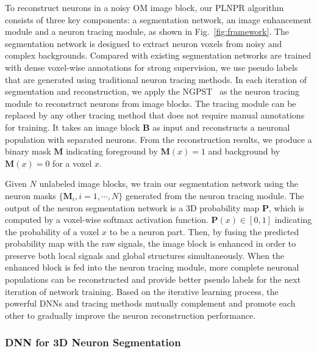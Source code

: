 To reconstruct neurons in a noisy OM image block, our PLNPR algorithm consists of three key components: a segmentation network, an image enhancement module and a neuron tracing module, as shown in Fig.~\ref{fig:framework}. 
%
The segmentation network is designed to extract neuron voxels from noisy and complex backgrounds.
Compared with existing segmentation networks are trained with dense voxel-wise annotations for strong supervision, we use pseudo labels that are generated using traditional neuron tracing methods.
%
In each iteration of segmentation and reconstruction, we apply the NGPST~\cite{Quan2015} as the neuron tracing module to reconstruct neurons from image blocks. 
The tracing module can be replaced by any other tracing method that does not require manual annotations for training.
%
It takes an image block $\mathbf{B}$ as input and reconstructs a neuronal population with separated neurons.
From the reconstruction results, we produce a binary mask $\mathbf{M}$ indicating foreground by $\mathbf{M}(x)=1$ and background by $\mathbf{M}(x)=0$ for a voxel $x$.


Given $N$ unlabeled image blocks, we train our segmentation network using the neuron masks $\{\mathbf{M}_i, i=1,\cdots,N\}$ generated from the neuron tracing module.
%
The output of the neuron segmentation network is a 3D probability map $\mathbf{P}$, which is computed by a voxel-wise softmax activation function. $\mathbf{P}(x)\in [0,1]$ indicating the probability of a voxel $x$ to be a neuron part.
%
Then, by fusing the predicted probability map with the raw signals, the image block is enhanced in order to preserve both local signals and global structures simultaneously.
When the enhanced block is fed into the neuron tracing module, more complete neuronal populations can be reconstructed and provide better pseudo labels for the next iteration of network training. 
%
Based on the iterative learning process, the powerful DNNs and tracing methods mutually complement and promote each other to gradually improve the neuron reconstruction performance.


 

\subsubsection{DNN for 3D Neuron Segmentation}
\label{sec:network}
 
